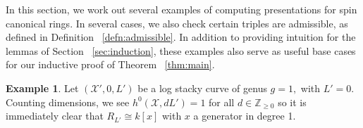 \documentclass{amsart}
\theoremstyle{plain}
\theoremstyle{definition}
\newtheorem{example}[thm]{Example}
\theoremstyle{remark}
\numberwithin{equation}{section}
\newcommand\sx{\mathscr X}
\newcommand{\halfcan}{L}
\begin{document}
In this section, we work out several examples of computing presentations for spin canonical rings. In several cases, we also check certain triples are admissible, as defined in Definition ~\ref{defn:admissible}. In addition to providing intuition for the lemmas of Section ~\ref{sec:induction}, these examples also serve as useful base cases for our inductive proof of Theorem ~\ref{thm:main}.

\begin{example}
\label{eg:base-1-0}
Let $(\sx',0, \halfcan')$ be a log stacky curve of genus $g = 1,$ with $\halfcan' = 0$.
Counting dimensions, we see $h^0(\sx, dL')=1$ for all $d\in \mathbb{Z}_{\ge 0}$ so it is immediately clear that $R_{\halfcan'} \cong k[x]$ with $x$ a generator in degree 1.
\end{example}
\end{document}
